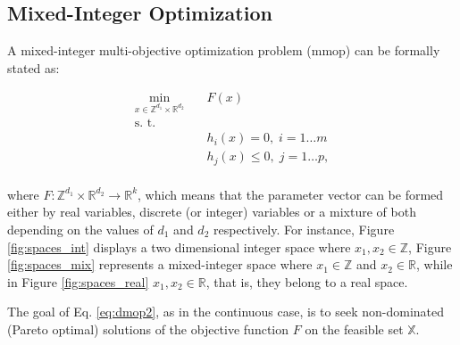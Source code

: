 \subsection{Mixed-Integer Optimization}
\label{sec:mixed_integer_mops}

A mixed-integer multi-objective optimization problem (\gls{mmop}) can be formally stated as:

\begin{equation}
	\begin{aligned}
	\underset{x  \in \mathbb{Z}^{d_{1}} \times \mathbb{R}^{d_{2}}}{\text{min}}
	& \quad F(x)\\
	\text{s. t.}\\
	& \quad h_i(x) = 0, \; i = 1 \ldots m\\
	& \quad h_j(x) \leq 0, \; j = 1 \ldots p,\\
	\end{aligned}
	\label{eq:dmop2}
\end{equation}

\noindent where $F:\mathbb{Z}^{d_1} \times \mathbb{R}^{d_2} \to \mathbb{R}^k$, which means that the parameter vector can be formed either by real variables, discrete (or integer) variables or a mixture of both depending on the values of $d_1$ and $d_2$ respectively. For instance, Figure \ref{fig:spaces_int} displays a two dimensional integer space where $x_1, x_2 \in \mathbb{Z}$, Figure \ref{fig:spaces_mix} represents a mixed-integer space where $x_1 \in \mathbb{Z}$ and $x_2 \in \mathbb{R}$,  while in Figure \ref{fig:spaces_real} $x_1, x_2 \in \mathbb{R}$, that is, they belong to a real space.

The goal of Eq. \eqref{eq:dmop2}, as in the continuous case, is to seek non-dominated (Pareto optimal) solutions of the objective function $F$ on the feasible set $\mathbb{X}$.

\begin{comment}

\begin{figure}[H]
    \subfloat[Integer space \label{fig:spaces_int}]{%
    	\centering \def\svgwidth{120pt} 
		 
    }
    \hfill
    \subfloat[Mixed-Integer space \label{fig:spaces_mix}]{%
    	\centering \def\svgwidth{120pt} 
		 
    }
     \hfill
    \subfloat[Real space \label{fig:spaces_real}]{%
      \centering \def\svgwidth{120pt} 
		 
    }
    \caption{Examples of decision spaces}
    \label{fig:spaces_mixed_integer}
\end{figure}

\end{comment}

